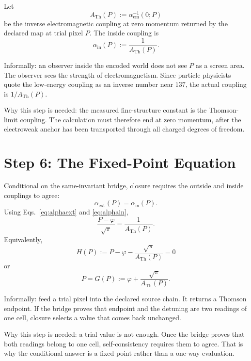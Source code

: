 \documentclass[11pt]{article}
\theoremstyle{remark}
\newcommand{\ATh}{A_{\mathrm{Th}}}
\begin{document}
Let
\begin{equation}
\ATh(P):=\alpha_{\mathrm{em}}^{-1}(0;P)
\label{eq:ATdef}
\end{equation}
be the inverse electromagnetic coupling at zero momentum returned by the
declared map at trial pixel \(P\). The inside coupling is
\begin{equation}
\alpha_{\mathrm{in}}(P):=\frac{1}{\ATh(P)}.
\label{eq:alphain}
\end{equation}

Informally: an observer inside the encoded world does not see \(P\) as a screen area. The observer sees the strength of electromagnetism. Since particle physicists quote the low-energy coupling as an inverse number near \(137\), the actual coupling is \(1/\ATh(P)\).

Why this step is needed: the measured fine-structure constant is the Thomson-limit coupling. The calculation must therefore end at zero momentum, after the electroweak anchor has been transported through all charged degrees of freedom.

\section{Step 6: The Fixed-Point Equation}

Conditional on the same-invariant bridge, closure requires the outside and inside couplings to agree:
\begin{equation}
\alpha_{\mathrm{ext}}(P)=\alpha_{\mathrm{in}}(P).
\label{eq:couplingmatch}
\end{equation}
Using Eqs.~\eqref{eq:alphaext} and \eqref{eq:alphain},
\begin{equation}
\frac{P-\varphi}{\sqrt\pi}
=
\frac{1}{\ATh(P)}.
\end{equation}
Equivalently,
\begin{equation}
\boxed{
H(P):=P-\varphi-\frac{\sqrt\pi}{\ATh(P)}=0
}
\label{eq:H}
\end{equation}
or
\begin{equation}
\boxed{
P=G(P):=\varphi+\frac{\sqrt\pi}{\ATh(P)}.
}
\label{eq:G}
\end{equation}

Informally: feed a trial pixel into the declared source chain. It returns a
Thomson endpoint. If the bridge proves that endpoint and the detuning are two
readings of one cell, closure selects a value that comes back unchanged.

Why this step is needed: a trial value is not enough. Once the bridge proves
that both readings belong to one cell, self-consistency requires them to
agree. That is why the conditional answer is a fixed point rather than a
one-way evaluation.
\end{document}
